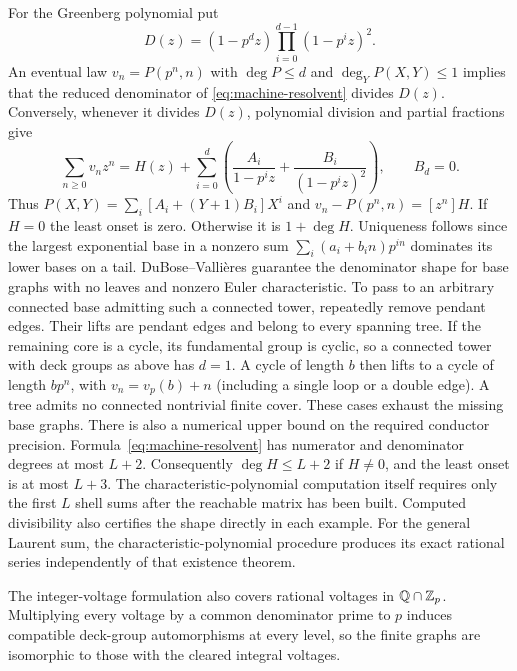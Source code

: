 For the Greenberg polynomial put
\[
 D(z)=(1-p^d z)\prod_{i=0}^{d-1}(1-p^i z)^2 .
\]
An eventual law $v_n=P(p^n,n)$ with $\deg P\le d$ and
$\deg_Y P(X,Y)\le1$ implies that the reduced denominator of
\eqref{eq:machine-resolvent} divides $D(z)$. Conversely, whenever it
divides $D(z)$, polynomial division and partial fractions give
\[
 \sum_{n\ge0}v_nz^n
 =H(z)+\sum_{i=0}^d\left(\frac{A_i}{1-p^i z}
            +\frac{B_i}{(1-p^i z)^2}\right),\qquad B_d=0 .
\]
Thus $P(X,Y)=\sum_i[A_i+(Y+1)B_i]X^i$ and
$v_n-P(p^n,n)=[z^n]H$. If $H=0$ the least onset is zero.
Otherwise it is $1+\deg H$. Uniqueness follows since the largest
exponential base in a nonzero sum $\sum_i(a_i+b_i n)p^{in}$ dominates
its lower bases on a tail. DuBose--Vallières guarantee the denominator
shape for base graphs with no leaves and nonzero Euler characteristic.
To pass to an arbitrary connected base admitting such a connected tower,
repeatedly remove pendant edges. Their lifts are pendant edges and belong
to every spanning tree. If the remaining core is a cycle, its fundamental
group is cyclic, so a connected tower with deck groups as above has
$d=1$. A cycle of length $b$ then lifts to a cycle of length $bp^n$,
with $v_n=v_p(b)+n$ (including a single loop or a double edge).
A tree admits no connected nontrivial finite cover. These cases exhaust
the missing base graphs. There is also a numerical upper bound on the required conductor precision. Formula~\eqref{eq:machine-resolvent} has numerator and denominator degrees at most $L+2$. Consequently $\deg H\le L+2$ if $H\ne0$, and the least onset is at most $L+3$. The characteristic-polynomial computation itself requires only the first $L$ shell sums after the reachable matrix has been built. Computed divisibility
also certifies the shape directly in each example. For the general
Laurent sum, the characteristic-polynomial procedure produces its
exact rational series independently of that existence theorem.

The integer-voltage formulation also covers rational voltages in
$\mathbb Q\cap\mathbb Z_p$. Multiplying every voltage by a common denominator prime
to $p$ induces compatible deck-group automorphisms at every level,
so the finite graphs are isomorphic to those with the cleared
integral voltages.

